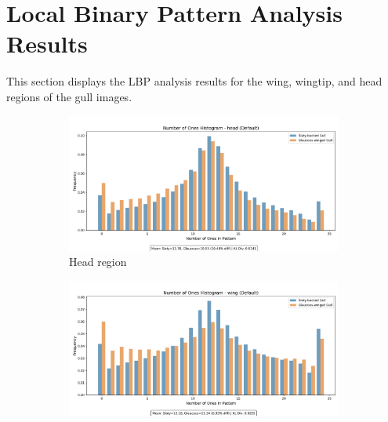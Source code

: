 \documentclass[a4paper,12pt]{report}
\begin{document}

\section{Local Binary Pattern Analysis Results}
\label{sec:lbp_analysis}

This section displays the LBP analysis results for the wing, wingtip, and head regions of the gull images.

\begin{figure}[H]
    \centering
    \begin{subfigure}[b]{0.32\textwidth}
        \centering
        \includegraphics[width=\textwidth]{images/appendix/Number_of_Ones_Analysis/default_head_ones_histogram.png}
        \caption{Head region}
        \label{fig:lbp_head}
    \end{subfigure}
    \hfill
    \begin{subfigure}[b]{0.32\textwidth}
        \centering
        \includegraphics[width=\textwidth]{images/appendix/Number_of_Ones_Analysis/default_wing_ones_histogram.png}

\end{subfigure}
\end{figure}
\end{document}

